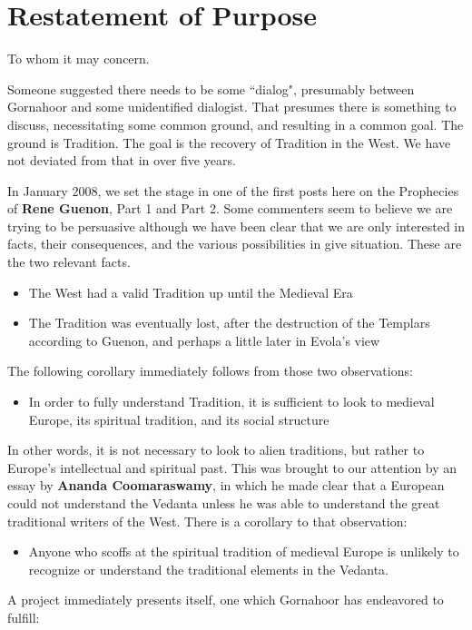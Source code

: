 \section{Restatement of Purpose}

To whom it may concern.

Someone suggested there needs to be some ``dialog", presumably between Gornahoor and some unidentified dialogist. That presumes there is something to discuss, necessitating some common ground, and resulting in a common goal. The ground is Tradition. The goal is the recovery of Tradition in the West. We have not deviated from that in over five years.

In January 2008, we set the stage in one of the first posts here on the Prophecies of \textbf{Rene Guenon}, Part 1 and Part 2. Some commenters seem to believe we are trying to be persuasive although we have been clear that we are only interested in facts, their consequences, and the various possibilities in give situation. These are the two relevant facts.

\begin{itemize}
\item The West had a valid Tradition up until the Medieval Era 
\item The Tradition was eventually lost, after the destruction of the Templars according to Guenon, and perhaps a little later in Evola's view 
\end{itemize}
The following corollary immediately follows from those two observations:

\begin{itemize}
\item In order to fully understand Tradition, it is sufficient to look to medieval Europe, its spiritual tradition, and its social structure 
\end{itemize}
In other words, it is not necessary to look to alien traditions, but rather to Europe's intellectual and spiritual past. This was brought to our attention by an essay by \textbf{Ananda Coomaraswamy}, in which he made clear that a European could not understand the Vedanta unless he was able to understand the great traditional writers of the West. There is a corollary to that observation:

\begin{itemize}
\item Anyone who scoffs at the spiritual tradition of medieval Europe is unlikely to recognize or understand the traditional elements in the Vedanta. 
\end{itemize}
A project immediately presents itself, one which Gornahoor has endeavored to fulfill:

